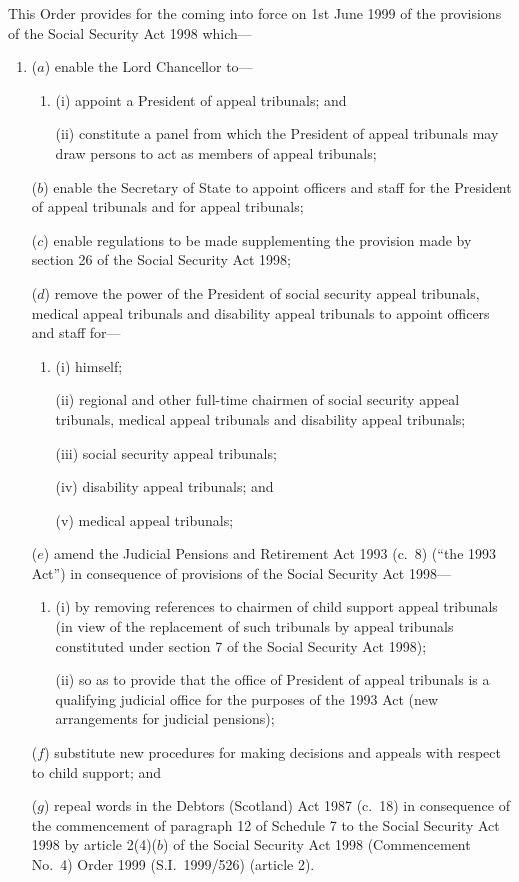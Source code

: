 \documentclass[12pt,a4paper]{article}
\begin{document}
This Order provides for the coming into force on 1st June 1999 of the provisions of the Social Security Act 1998 which—
\begin{enumerate}\item[]
($a$) enable the Lord Chancellor to—
\begin{enumerate}\item[]
(i) appoint a President of appeal tribunals; and

(ii) constitute a panel from which the President of appeal tribunals may draw persons to act as members of appeal tribunals;
\end{enumerate}

($b$) enable the Secretary of State to appoint officers and staff for the President of appeal tribunals and for appeal tribunals;

($c$) enable regulations to be made supplementing the provision made by section 26 of the Social Security Act 1998;

($d$) remove the power of the President of social security appeal tribunals, medical appeal tribunals and disability appeal tribunals to appoint officers and staff for—
\begin{enumerate}\item[]
(i) himself;

(ii) regional and other full-time chairmen of social security appeal tribunals, medical appeal tribunals and disability appeal tribunals;

(iii) social security appeal tribunals;

(iv) disability appeal tribunals; and

(v) medical appeal tribunals;
\end{enumerate}

($e$) amend the Judicial Pensions and Retirement Act 1993 (c.\ 8) (“the 1993 Act”) in consequence of provisions of the Social Security Act 1998—
\begin{enumerate}\item[]
(i) by removing references to chairmen of child support appeal tribunals (in view of the replacement of such tribunals by appeal tribunals constituted under section 7 of the Social Security Act 1998);

(ii) so as to provide that the office of President of appeal tribunals is a qualifying judicial office for the purposes of the 1993 Act (new arrangements for judicial pensions);
\end{enumerate}

($f$) substitute new procedures for making decisions and appeals with respect to child support; and

($g$) repeal words in the Debtors (Scotland) Act 1987 (c.\ 18) in consequence of the commencement of paragraph 12 of Schedule 7 to the Social Security Act 1998 by article 2(4)($b$) of the Social Security Act 1998 (Commencement No.\ 4) Order 1999 (S.I.\ 1999/526) (article 2).
\end{enumerate}
\end{document}
